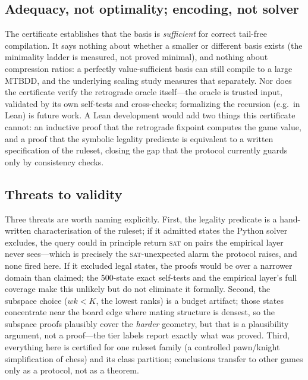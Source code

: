 \documentclass[conference]{IEEEtran}
\begin{document}
\subsection{Adequacy, not optimality; encoding, not solver}
The certificate establishes that the basis is \emph{sufficient} for correct
tail-free compilation. It says nothing about whether a smaller or different
basis exists (the minimality ladder is measured, not proved minimal), and
nothing about compression ratios: a perfectly value-sufficient basis can
still compile to a large MTBDD, and the underlying scaling study measures
that separately. Nor does the certificate verify the retrograde oracle
itself---the oracle is trusted input, validated by its own self-tests and
cross-checks; formalizing the recursion (e.g.\ in Lean) is future work.
A Lean development would add two things this certificate cannot: an
inductive proof that the retrograde fixpoint computes the game value, and
a proof that the symbolic legality predicate is equivalent to a written
specification of the ruleset, closing the gap that the protocol currently
guards only by consistency checks.

\subsection{Threats to validity}
Three threats are worth naming explicitly. First, the legality predicate is
a hand-written characterisation of the ruleset; if it admitted states the
Python solver excludes, the query could in principle return \textsc{sat}
on pairs the empirical layer never sees---which is precisely the
\textsc{sat}-unexpected alarm the protocol raises, and none fired here. If
it excluded legal states, the proofs would be over a narrower domain than
claimed; the 500-state exact self-tests and the empirical layer's full
coverage make this unlikely but do not eliminate it formally. Second, the
subspace choice ($wk < K$, the lowest ranks) is a budget artifact; those
states concentrate near the board edge where mating structure is densest,
so the subspace proofs plausibly cover the \emph{harder} geometry, but that
is a plausibility argument, not a proof---the tier labels report exactly
what was proved. Third, everything here is certified for one ruleset
family (a controlled pawn/knight simplification of chess) and its class
partition; conclusions transfer to other games only as a protocol, not as
a theorem.
\end{document}
